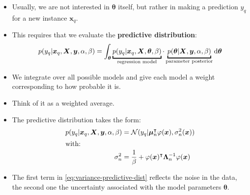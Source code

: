 \begin{frame}
	\begin{itemize}
		\item Usually, we are not interested in $\bm{\theta}$ itself, but rather in making a prediction $y_q$ for a new instance $\bm{x}_q$.
		\item This requires that we evaluate the \textbf{predictive distribution}:
		\begin{equation}
			p(y_q \vert \bm{x}_q, \bm{X}, \bm{y}, \alpha, \beta) = \int_{\bm{\theta}} \underbracket{p(y_q \vert \bm{x}_q, \bm{X}, \bm{\theta}, \beta)}_{\text{regression model}} \cdot
				\underbracket{p(\bm{\theta} \vert \bm{X}, \bm{y}, \alpha, \beta)}_{\text{parameter posterior}} \diff \bm{\theta}
		\end{equation}
		\item We integrate over all possible models and give each model a weight corresponding to how probable it is.
		\item Think of it as a weighted average.
		\item The predictive distribution takes the form:
		\begin{align}
			p(y_q \vert \bm{x}_q, \bm{X}, \bm{y}, \alpha, \beta)
				&= \mathcal{N}(y_q \vert \bm{\mu}_n^{\intercal} \varphi(\bm{x}), \sigma_n^2(\bm{x})) \\
			\shortintertext{with:}
			\sigma_n^2
				&= \frac{1}{\beta} + \varphi(\bm{x})^{\intercal} \bm{\Lambda}_n^{-1} \varphi(\bm{x})
				\label{eq:variance-predictive-dist}
		\end{align}
		\item The first term in \cref{eq:variance-predictive-dist} reflects the noise in the data, the second one the uncertainty associated with the model parameters $\bm{\theta}$.
	\end{itemize}
\end{frame}


\begin{frame}
\end{frame}


